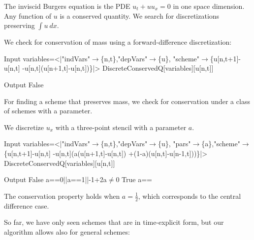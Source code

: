 \documentclass[runningheads]{llncs}
\newcommand{\1}{\chi}
\begin{document}
The inviscid Burgers equation is the PDE \(u_t+uu_x=0\) \cite{smoller94} in one space dimension. Any function of \(u\) is a conserved quantity. We search for discretizations preserving \(\int u\ dx\).
\begin{example}
	We check for conservation of mass using a forward-difference discretization:
	
	\begin{small}
		\begin{mmaCell}[moredefined={variables, expression, DiscreteConservedQ}]{Input}
  variables=<|"indVars"\(\pmb{\to}\)\{n,t\},"depVars"\(\pmb{\to}\)\{u\},
  "scheme"\(\pmb{\to}\)\{u[n,t+1]-u[n,t]
  -u[n,t](u[n+1,t]-u[n,t])\}|>
  DiscreteConservedQ[variables][u[n,t]]
  
\end{mmaCell}
		\begin{mmaCell}{Output}
  False
\end{mmaCell}
	\end{small}
\end{example}
For finding a scheme that preserves mass, we check for conservation under a class of schemes with a parameter.
\begin{example}
	We discretize \(u_x\) with a three-point stencil with a parameter \(a\).
	
	\begin{small}
		\begin{mmaCell}[moredefined={variables, expression, DiscreteConservedQ}]{Input}
  variables=<|"indVars"\(\pmb{\to}\)\{n,t\},"depVars"\(\pmb{\to}\)\{u\},
  "pars"\(\pmb{\to}\)\{a\},"scheme"\(\pmb{\to}\)\{u[n,t+1]-u[n,t]
  -u[n,t](a(u[n+1,t]-u[n,t])
  +(1-a)(u[n,t]-u[n-1,t]))\}|>
  DiscreteConservedQ[variables][u[n,t]]
  
\end{mmaCell}
		\begin{mmaCell}{Output}
  False		a==0||a==1||-1+2a\(\neq\)0
  True		a==\mmaFrac{1}{2}
  
\end{mmaCell}
	\end{small}
The conservation property holds when \(a=\frac{1}{2}\), which corresponds to the central difference case.
\end{example}
So far, we have only seen schemes that are in time-explicit form, but our algorithm allows also for general schemes:
\end{document}
